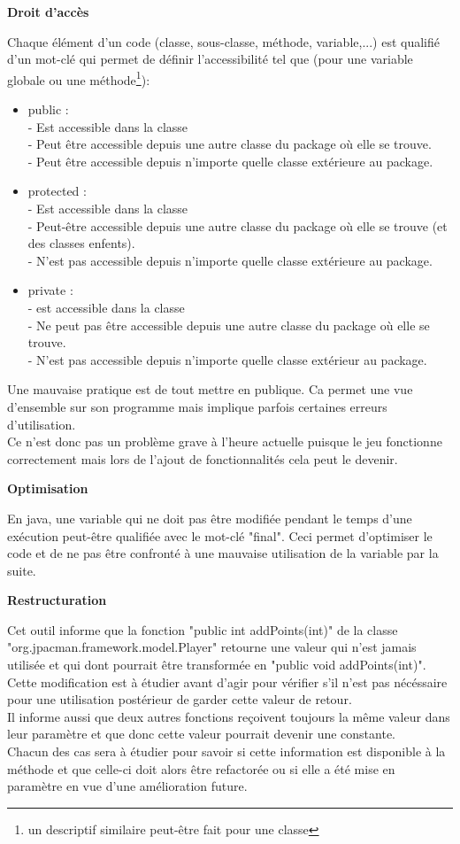 \documentclass[12pt,a4paper,final]{article}
\newcommand{\smalltitle}[1]{\bigskip\large\textbf{#1}\par\normalsize\medskip}
\begin{document}
\smalltitle{Droit d'accès}
Chaque élément d'un code (classe, sous-classe, méthode, variable,...) est qualifié d'un mot-clé qui permet de définir l'accessibilité tel que (pour une variable globale ou une méthode\footnote{un descriptif similaire peut-être fait pour une classe}): 
\begin{itemize}
\item public : \\
- Est accessible dans la classe\\
- Peut être accessible depuis une autre classe du package où elle se trouve.\\
- Peut être accessible depuis n'importe quelle classe extérieure au package.
\item protected :\\
- Est accessible dans la classe\\
- Peut-être accessible depuis une autre classe du package où elle se trouve (et des classes enfents).\\
- N'est pas accessible depuis n'importe quelle classe extérieure au package.
\item private :\\
- est accessible dans la classe\\
- Ne peut pas être accessible depuis une autre classe du package où elle se trouve.\\
- N'est pas accessible depuis n'importe quelle classe extérieur au package.
\end{itemize}
Une mauvaise pratique est de tout mettre en publique. Ca permet une vue d'ensemble sur son programme mais implique parfois certaines erreurs d'utilisation.\\
Ce n'est donc pas un problème grave à l'heure actuelle puisque le jeu fonctionne correctement mais lors de l'ajout de fonctionnalités cela peut le devenir.

\smalltitle{Optimisation}
En java, une variable qui ne doit pas être modifiée pendant le temps d'une exécution peut-être qualifiée avec le mot-clé "final". Ceci permet d'optimiser le code et de ne pas être confronté à une mauvaise utilisation de la variable par la suite.

\smalltitle{Restructuration}
Cet outil informe que la fonction "public int addPoints(int)" de la classe "org.jpacman.framework.model.Player" retourne une valeur qui n'est jamais utilisée et qui dont pourrait être transformée en "public void addPoints(int)".\\
Cette modification est à étudier avant d'agir pour vérifier s'il n'est pas nécéssaire pour une utilisation postérieur de garder cette valeur de retour.\\
Il informe aussi que deux autres fonctions reçoivent toujours la même valeur dans leur paramètre et que donc cette valeur pourrait devenir une constante.\\
Chacun des cas sera à étudier pour savoir si cette information est disponible à la méthode et que celle-ci doit alors être refactorée ou si elle a été mise en paramètre en vue d'une amélioration future.
\end{document}

